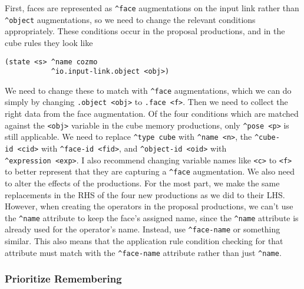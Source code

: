 First, faces are represented as \texttt{\^{}face} augmentations on the
input link rather than \texttt{\^{}object} augmentations, so we need to
change the relevant conditions appropriately. These conditions occur in
the proposal productions, and in the cube rules they look like

\begin{verbatim}
(state <s> ^name cozmo
           ^io.input-link.object <obj>)
\end{verbatim}

We need to change these to match with \texttt{\^{}face} augmentations,
which we can do simply by changing
\texttt{.object\ \textless{}obj\textgreater{}} to
\texttt{.face\ \textless{}f\textgreater{}}. Then we need to collect the
right data from the face augmentation. Of the four conditions which are
matched against the \texttt{\textless{}obj\textgreater{}} variable in
the cube memory productions, only
\texttt{\^{}pose\ \textless{}p\textgreater{}} is still applicable. We
need to replace \texttt{\^{}type\ cube} with
\texttt{\^{}name\ \textless{}n\textgreater{}}, the
\texttt{\^{}cube-id\ \textless{}cid\textgreater{}} with
\texttt{\^{}face-id\ \textless{}fid\textgreater{}}, and
\texttt{\^{}object-id\ \textless{}oid\textgreater{}} with
\texttt{\^{}expression\ \textless{}exp\textgreater{}}. I also recommend
changing variable names like \texttt{\textless{}c\textgreater{}} to
\texttt{\textless{}f\textgreater{}} to better represent that they are
capturing a \texttt{\^{}face} augmentation. We also need to alter the
effects of the productions. For the most part, we make the same
replacements in the RHS of the four new productions as we did to their
LHS. However, when creating the operators in the proposal productions,
we can't use the \texttt{\^{}name} attribute to keep the face's assigned
name, since the \texttt{\^{}name} attribute is already used for the
operator's name. Instead, use \texttt{\^{}face-name} or something
similar. This also means that the application rule condition checking
for that attribute must match with the \texttt{\^{}face-name} attribute
rather than just \texttt{\^{}name}.

\hypertarget{prioritize-remembering}{%
\subsubsection{Prioritize Remembering}\label{prioritize-remembering}}

